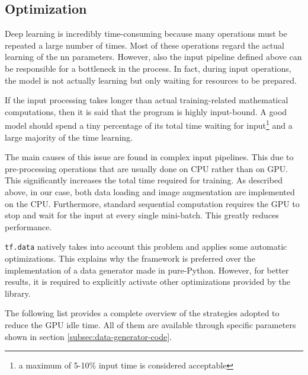 \subsection{Optimization}

Deep learning is incredibly time-consuming because many operations must be repeated a large number of times. Most of these operations regard the actual learning of the \gls{nn} parameters. However, also the input pipeline defined above can be responsible for a bottleneck in the process. In fact, during input operations, the model is not actually learning but only waiting for resources to be prepared.

If the input processing takes longer than actual training-related mathematical computations, then it is said that the program is highly input-bound. A good model should spend a tiny percentage of its total time waiting for input\footnote{a maximum of 5-10\% input time is considered acceptable} and a large majority of the time learning.

\medskip

The main causes of this issue are found in complex input pipelines. This due to pre-processing operations that are usually done on CPU rather than on GPU. This significantly increases the total time required for training. As described above, in our case, both data loading and image augmentation are implemented on the CPU. Furthermore, standard sequential computation requires the GPU to stop and wait for the input at every single mini-batch. This greatly reduces performance.

\texttt{tf.data} natively takes into account this problem and applies some automatic optimizations. This explains why the framework is preferred over the implementation of a data generator made in pure-Python. However, for better results, it is required to explicitly activate other optimizations provided by the library.

The following list provides a complete overview of the strategies adopted to reduce the GPU idle time. All of them are available through specific parameters shown in section \ref{subsec:data-generator-code}.

